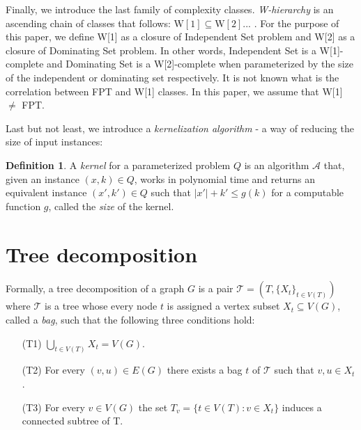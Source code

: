 \documentclass[en]{pracamgr}
\theoremstyle{definition}
\newtheorem{definition}{Definition}
\newcommand{\domsetp}{{\sc Dominating Set}}
\newcommand{\indset}{{\sc Independent Set}}
\newcommand{\w}[1]{\textrm{W}[#1]}
\begin{document}
Finally, we introduce the last family of complexity classes. \emph{W-hierarchy} is an ascending chain of classes that follows: $\w{1} \subseteq \w{2}...$ . For the purpose of this paper, we define \w{1} as a closure of \indset{} problem and \w{2} as a closure of \domsetp{} problem. In other words, \indset{} is a \w{1}-complete and \domsetp{} is a \w{2}-complete when parameterized by the size of the independent or dominating set respectively. It is not known what is the correlation between FPT and \w{1} classes. In this paper, we assume that \w{1} $\neq$ FPT. 

Last but not least, we introduce a \emph{kernelization algorithm} - a way of reducing the size of input instances:

\begin{definition}\label{Kernel}
	A \textit{kernel} for a parameterized problem $Q$ is an algorithm $\mathcal{A}$ that, given an instance $(x,k) \in Q$, works in polynomial time and returns an equivalent instance $(x',k') \in Q$
	such that $|x'| + k' \leq g(k)$ for a computable function $g$, called the \textit{size} of the kernel.
\end{definition}

\section{Tree decomposition}

Formally, a tree decomposition of a graph $G$ is a pair $\mathcal{T} = (T, \{X_t\}_{t\in V(T)})$ where $\mathcal{T}$ is a tree whose every node $t$ is assigned a vertex subset $X_t \subseteq V(G)$, called a \emph{bag}, such that the following three conditions hold:
\begin{itemize}
	\item[(T1)] $\bigcup_{t\in V(T)}X_t = V(G)$.
	\item[(T2)] For every $(v,u) \in E(G)$ there exists a bag $t$ of $\mathcal{T}$ such that $v,u \in X_t$.
	\item[(T3)] For every $v \in V(G)$ the set $T_v = \{t \in V(T): v \in X_t\}$ induces a connected subtree of T.
\end{itemize}
\end{document}
